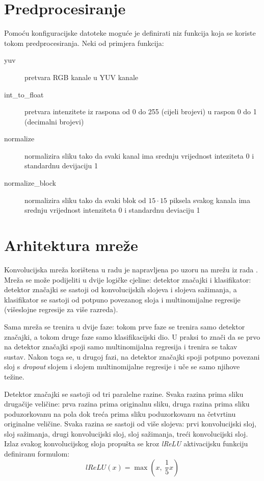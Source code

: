 \documentclass[times, utf8, diplomski, numeric]{fer}
\begin{document}
\section{Predprocesiranje}
Pomoću konfiguracijske datoteke moguće je definirati niz funkcija koja se koriste tokom predprocesiranja. Neki od primjera funkcija:
\begin{description}
  \item[yuv] pretvara RGB kanale u YUV kanale
  \item[int\_to\_float] pretvara intenzitete iz raspona od 0 do 255 (cijeli brojevi) u raspon 0 do 1 (decimalni brojevi)
  \item[normalize] normalizira sliku tako da svaki kanal ima srednju vrijednost inteziteta 0 i standardnu devijaciju 1
  \item[normalize\_block] normalizira sliku tako da svaki blok od $15 \cdot 15$ piksela svakog kanala ima srednju vrijednost intenziteta 0 i standardnu deviaciju 1
\end{description}


\section{Arhitektura mreže}
\label{chap:net_architecture}

Konvolucijska mreža korištena u radu je napravljena po uzoru na mrežu iz rada \cite{farabet_pami}. Mreža se može podijeliti u dvije logičke cjeline: detektor značajki i klasifikator: detektor značajki se sastoji od konvolucijskih slojeva i slojeva sažimanja, a klasifikator se sastoji od potpuno povezanog sloja i multinomijalne regresije (višeslojne regresije za više razreda).

Sama mreža se trenira u dvije faze: tokom prve faze se trenira samo detektor značajki, a tokom druge faze samo klasifikacijski dio. U praksi to znači da se prvo na detektor značajki spoji samo multinomijalna regresija i trenira se takav sustav. Nakon toga se, u drugoj fazi, na detektor značajki spoji potpuno povezani sloj s \emph{dropout} slojem i slojem multinomijalne regresije i uče se samo njihove težine.

Detektor značajki se sastoji od tri paralelne razine. Svaka razina prima sliku drugačije veličine: prva razina prima originalnu sliku, druga razina prima sliku poduzorkovanu na pola dok treća prima sliku poduzorkovanu na četvrtinu originalne veličine. Svaka razina se sastoji od više slojeva: prvi konvolucijski sloj, sloj sažimanja, drugi konvolucijski sloj, sloj sažimanja, treći konvolucijski sloj. Izlaz svakog konvolucijskog sloja propušta se kroz \textit{lReLU} aktivacijsku funkciju definiranu formulom:
\begin{equation}
  lReLU( x ) = \max(x,\ \frac{1}{5} x)
\end{equation}
\end{document}
